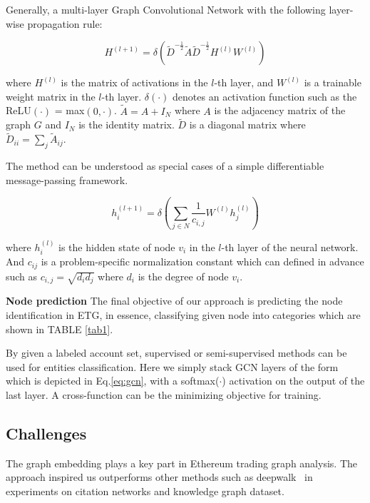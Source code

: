  Generally, a multi-layer Graph Convolutional Network with the following layer-wise propagation rule:

\begin{equation}
H^{(l+1)}=\delta(\tilde{D}^{-\frac{1}{2}}\tilde{A}\tilde{D}^{-\frac{1}{2}}H^{(l)}W^{(l)})
\label{eq1}
\end{equation}

where $H^{(l)}$ is the matrix of activations in the $l$-th layer, and $W^{(l)}$ is a trainable weight matrix in the $l$-th layer. $\delta(\cdot)$ denotes an activation function such as the ReLU$(\cdot)$ = max$(0,\cdot)$. $\tilde{A}=A+I_N$ where $A$ is the adjacency matrix of the graph $G$ and $I_N$ is the identity matrix. $\tilde{D}$ is a diagonal matrix where $\tilde{D}_{ii}=\sum_{j}\tilde{A}_{ij}$.

The method can be understood as special cases of a simple differentiable message-passing framework.

\begin{equation}
h_i^{(l+1)}=\delta(\sum_{j \in N} \frac{1}{c_{i,j}}W^{(l)}h_j^{(l)})
\label{eq:gcn}
\end{equation}

where $h_i^{(l)}$ is the hidden state of node $v_i$ in the $l$-th layer of the neural network. And $c_{ij}$ is a problem-specific normalization constant which can defined in advance such as $c_{i,j}=\sqrt{d_i d_j}$ where $d_i$ is the degree of node $v_i$.

\textbf{Node prediction}
The final objective of our approach is predicting the node identification in ETG, in essence, classifying given node into categories which are shown in TABLE \ref{tab1}.

By given a labeled account set, supervised or semi-supervised methods can be used for entities classification. Here we simply stack GCN layers of the form which is depicted in Eq.\ref{eq:gcn}, with a softmax($\cdot$) activation on the output of the last layer. A cross-function can be the minimizing objective for training. 

\subsection{Challenges}
\label{section:time}
The graph embedding plays a key part in Ethereum trading graph analysis. The approach \cite{kipf2016semi} inspired us outperforms other methods such as deepwalk~\cite{perozzi2014deepwalk} in experiments on citation networks and knowledge graph dataset. 

